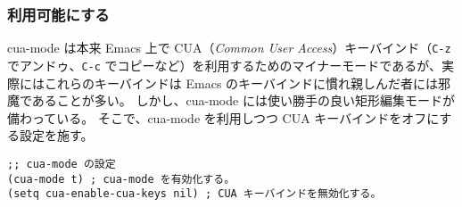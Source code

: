 \subsubsection{利用可能にする}
cua-mode は本来 Emacs 上で CUA（\emph{Common User Access}）キーバインド（\texttt{C-z} でアンドゥ、\texttt{C-c} でコピーなど）を利用するためのマイナーモードであるが、実際にはこれらのキーバインドは Emacs のキーバインドに慣れ親しんだ者には邪魔であることが多い。
しかし、cua-mode には使い勝手の良い矩形編集モードが備わっている。
そこで、cua-mode を利用しつつ CUA キーバインドをオフにする設定を施す。
\begin{mdframed}[roundcorner=0.50zw,leftmargin=3.00zw,rightmargin=3.00zw,skipabove=0.40zw,skipbelow=0.40zw,innertopmargin=4.00pt,innerbottommargin=4.00pt,innerleftmargin=5.00pt,innerrightmargin=5.00pt,linecolor=gray!020,linewidth=0.50pt,backgroundcolor=gray!20]
\begin{verbatim}
;; cua-mode の設定
(cua-mode t) ; cua-mode を有効化する。
(setq cua-enable-cua-keys nil) ; CUA キーバインドを無効化する。
\end{verbatim}
\end{mdframed}
